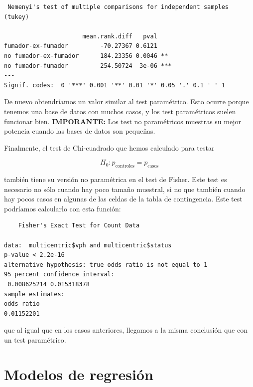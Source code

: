 \documentclass[
]{book}
\newenvironment{Shaded}{\begin{snugshade}}{\end{snugshade}}
\newcommand{\FunctionTok}[1]{\textcolor[rgb]{0.00,0.00,0.00}{#1}}
\newcommand{\NormalTok}[1]{#1}
\newcommand{\SpecialCharTok}[1]{\textcolor[rgb]{0.00,0.00,0.00}{#1}}
\begin{document}
\begin{verbatim}
 Nemenyi's test of multiple comparisons for independent samples (tukey)  

                      mean.rank.diff   pval    
fumador-ex-fumador         -70.27367 0.6121    
no fumador-ex-fumador      184.23356 0.0046 ** 
no fumador-fumador         254.50724  3e-06 ***
---
Signif. codes:  0 '***' 0.001 '**' 0.01 '*' 0.05 '.' 0.1 ' ' 1
\end{verbatim}

De nuevo obtendríamos un valor similar al test paramétrico. Esto ocurre porque tenemos una base de datos con muchos casos, y los test paramétricos suelen funcionar bien. \textbf{IMPORANTE:} Los test no paramétricos muestras su mejor potencia cuando las bases de datos son pequeñas.

Finalmente, el test de Chi-cuadrado que hemos calculado para testar

\[H_0: p_{\text{controles}}  = p_{\text{casos}}\]

también tiene su versión no paramétrica en el test de Fisher. Este test es necesario no sólo cuando hay poco tamaño muestral, si no que también cuando hay pocos casos en algunas de las celdas de la tabla de contingencia. Este test podríamos calcularlo con esta función:

\begin{Shaded}
\end{Shaded}

\begin{verbatim}
    Fisher's Exact Test for Count Data

data:  multicentric$vph and multicentric$status
p-value < 2.2e-16
alternative hypothesis: true odds ratio is not equal to 1
95 percent confidence interval:
 0.008625214 0.015318378
sample estimates:
odds ratio 
0.01152201 
\end{verbatim}

que al igual que en los casos anteriores, llegamos a la misma conclusión que con un test paramétrico.

\hypertarget{modelos-de-regresiuxf3n}{%
\chapter{Modelos de regresión}\label{modelos-de-regresiuxf3n}}
\end{document}

